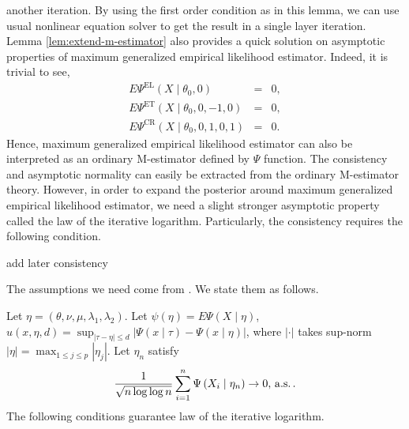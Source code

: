 another iteration. By using the first order condition as in this lemma,
we can use usual nonlinear equation solver to get the result in a
single layer iteration.  Lemma \ref{lem:extend-m-estimator}
also provides a quick solution on asymptotic properties of maximum
generalized empirical likelihood estimator. Indeed, it is trivial
to see, 
\begin{eqnarray*}
E\Psi^{\mathrm{EL}}\left(X\mid\theta_{0},0\right) & = & 0,\\
E\Psi^{\mathrm{ET}}\left(X\mid\theta_{0},0,-1,0\right) & = & 0,\\
E\Psi^{\mathrm{CR}}\left(X\mid\theta_{0},0,1,0,1\right) & = & 0.
\end{eqnarray*}
Hence, maximum generalized empirical likelihood estimator can also
be interpreted as an ordinary M-estimator defined by $\Psi$ function.
The consistency and asymptotic normality can  easily be extracted from
the ordinary M-estimator theory. However, in order to expand the posterior
around maximum generalized empirical likelihood estimator, we need
a slight stronger asymptotic property called the law of the iterative logarithm.
Particularly, the consistency requires the following condition.
\begin{assumption}
\label{assu:consistency-m-est}%
\begin{comment}
need to be specified
\end{comment}
add later consistency
\end{assumption}
The assumptions we need come from \citet{he1995law}. We state them
as follows.
\begin{assumption}
\label{assu:lil-m-est}Let $\eta=\left(\theta,\nu,\mu,\lambda_{1},\lambda_{2}\right)$.
Let $\psi\left(\eta\right)=E\Psi\left(X\mid\eta\right)$, $u\left(x,\eta,d\right)=\sup_{\left|\tau-\eta\right|\le d}\left|\Psi\left(x\mid\tau\right)-\Psi\left(x\mid\eta\right)\right|$,
where $\left|\cdot\right|$ takes sup-norm $\left|\eta\right|=\max_{1\le j\le p}\left|\eta_{j}\right|$.
Let $\eta_{n}$ satisfy 
\[
\frac{1}{\sqrt{n\log\log n}}\sum_{i=1}^{n}\Psi\left(X_{i}\mid\eta_{n}\right)\rightarrow0,\,\mathrm{a.s.}\,.
\]
 The following conditions guarantee law of the iterative logarithm.\end{assumption}
